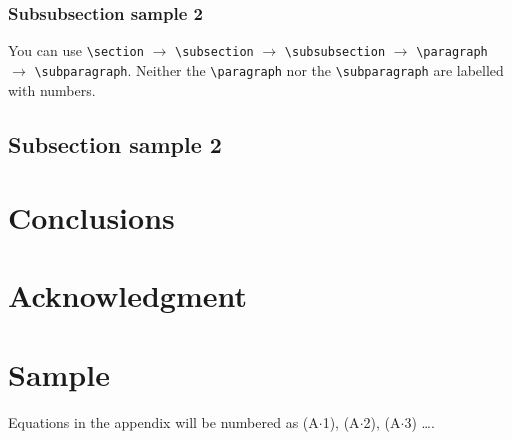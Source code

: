\documentclass{jpsj2}
\begin{document}
\subsubsection{Subsubsection sample 2}

You can use \verb|\section| $\to$ \verb|\subsection| $\to$ \verb|\subsubsection| $\to$ \verb|\paragraph| $\to$ \verb|\subparagraph|.  Neither the \verb|\paragraph| nor the \verb|\subparagraph| are labelled with numbers.

\subsection{Subsection sample 2}

\section{Conclusions}

\section*{Acknowledgment}

\appendix
\section{Sample}

Equations in the appendix will be numbered as (A$\cdot$1), (A$\cdot$2), (A$\cdot$3) \ldots.
\end{document}
